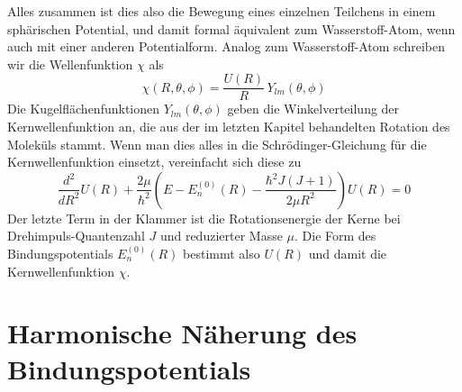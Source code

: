 Alles zusammen ist dies also die Bewegung eines einzelnen Teilchens in einem sphärischen Potential, und damit formal äquivalent zum Wasserstoff-Atom, wenn auch mit einer anderen Potentialform. Analog zum Wasserstoff-Atom schreiben wir die Wellenfunktion $\chi$ als
\begin{equation}
 \chi (R, \theta, \phi) = \frac{U(R)}{R} \, Y_{l m} (\theta, \phi)
\end{equation}
Die Kugelflächenfunktionen $ Y_{l m} (\theta, \phi)$ geben die Winkelverteilung der Kernwellenfunktion an, die aus der im letzten Kapitel behandelten Rotation des Moleküls stammt. Wenn man dies alles in die Schrödinger-Gleichung für die Kernwellenfunktion einsetzt, vereinfacht sich diese zu
\begin{equation}
 \frac{d^2}{d R^2} U(R) + \frac{2 \mu }{\hbar^2} \left( E - E_n^{(0)}(R) - \frac{\hbar^2 J (J+1)}{2 \mu R^2} \right) U(R) = 0
 \label{eq:vib_zweiatom_U}
\end{equation}
Der letzte Term in der Klammer ist die Rotationsenergie der Kerne bei  Drehimpuls-Quantenzahl $J$ und reduzierter Masse $\mu$. Die Form des Bindungspotentials $E_n^{(0)}(R)$ bestimmt also $U(R)$ und damit die Kernwellenfunktion $\chi$.


\section{Harmonische Näherung des Bindungspotentials}

